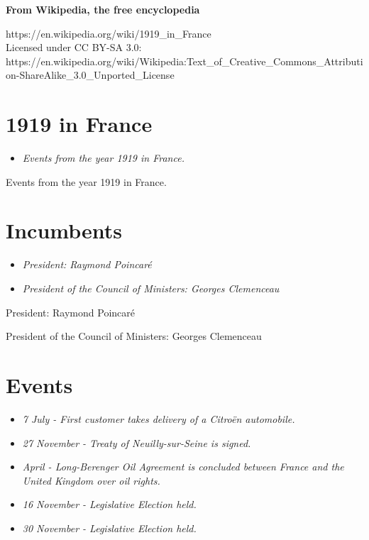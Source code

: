 \textbf{From Wikipedia, the free encyclopedia}

https://en.wikipedia.org/wiki/1919\_in\_France\\
Licensed under CC BY-SA 3.0:\\
https://en.wikipedia.org/wiki/Wikipedia:Text\_of\_Creative\_Commons\_Attribution-ShareAlike\_3.0\_Unported\_License

\section{1919 in France}\label{in-france}

\begin{itemize}
\item
  \emph{Events from the year 1919 in France.}
\end{itemize}

Events from the year 1919 in France.

\section{Incumbents}\label{incumbents}

\begin{itemize}
\item
  \emph{President: Raymond Poincaré}
\item
  \emph{President of the Council of Ministers: Georges Clemenceau}
\end{itemize}

President: Raymond Poincaré

President of the Council of Ministers: Georges Clemenceau

\section{Events}\label{events}

\begin{itemize}
\item
  \emph{7 July - First customer takes delivery of a Citroën automobile.}
\item
  \emph{27 November - Treaty of Neuilly-sur-Seine is signed.}
\item
  \emph{April - Long-Berenger Oil Agreement is concluded between France
  and the United Kingdom over oil rights.}
\item
  \emph{16 November - Legislative Election held.}
\item
  \emph{30 November - Legislative Election held.}
\end{itemize}

